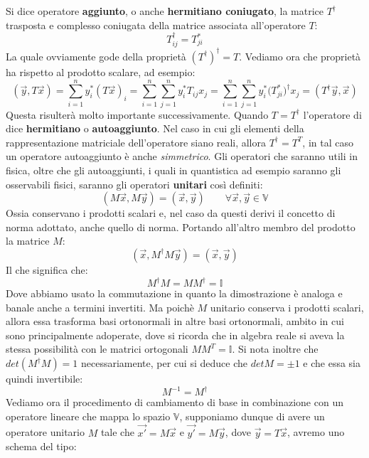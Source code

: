 Si dice operatore \textbf{aggiunto}, o anche \textbf{hermitiano coniugato}, la matrice $T^{\dagger}$ trasposta e complesso coniugata della matrice associata all'operatore $T$:
\begin{equation}
    T_{ij}^{\dagger} = T_{ji}^{*}
\end{equation}
La quale ovviamente gode della proprietà $(T^{\dagger})^{\dagger}=T$. Vediamo ora che proprietà ha rispetto al prodotto scalare, ad esempio:
\begin{equation*}
    (\vec{y},T\vec{x}) =
    \sum_{i=1}^{n} {y}_i^{*} (T\vec{x})_i =
    \sum_{i=1}^{n} \sum_{j=1}^{n} {y}_i^{*} T_{ij} x_j =
    \sum_{i=1}^{n} \sum_{j=1}^{n} {y}_i^{*} \bigl( T_{ji}^{*} \bigr)^{\dagger} x_j =
    (T^{\dagger}\vec{y},\vec{x})
\end{equation*}
Questa risulterà molto importante successivamente. Quando $T=T^{\dagger}$ l'operatore di dice \textbf{hermitiano} o \textbf{autoaggiunto}. Nel caso in cui gli elementi della rappresentazione matriciale dell'operatore siano reali, allora $T^{\dagger}=T^{T}$, in tal caso un operatore autoaggiunto è anche \textit{simmetrico}. Gli operatori che saranno utili in fisica, oltre che gli autoaggiunti, i quali in quantistica ad esempio saranno gli osservabili fisici, saranno gli operatori \textbf{unitari} così definiti:
\begin{equation}
    (M\vec{x},M\vec{y}) = (\vec{x},\vec{y}) \qquad \forall \vec{x},\vec{y} \in \mathbb{V}
\end{equation}
Ossia conservano i prodotti scalari e, nel caso da questi derivi il concetto di norma adottato, anche quello di norma. Portando all'altro membro del prodotto la matrice $M$:
\begin{equation*}
    (\vec{x},M^{\dagger}M\vec{y}) = (\vec{x},\vec{y})
\end{equation*}
Il che significa che:
\begin{equation}
    M^{\dagger}M = MM^{\dagger} = \mathbb{I}
\end{equation}
Dove abbiamo usato la commutazione in quanto la dimostrazione è analoga e banale anche a termini invertiti. Ma poichè $M$ unitario conserva i prodotti scalari, allora essa trasforma basi ortonormali in altre basi ortonormali, ambito in cui sono principalmente adoperate, dove si ricorda che in algebra reale si aveva la stessa possibilità con le matrici ortogonali $MM^{T}=\mathbb{I}$. Si nota inoltre che $det(M^{\dagger}M)=1$ necessariamente, per cui si deduce che $detM=\pm 1$ e che essa sia quindi invertibile:
\begin{equation}
    M^{-1} = M^{\dagger}
\end{equation}
Vediamo ora il procedimento di cambiamento di base in combinazione con un operatore lineare che mappa lo spazio $\mathbb{V}$, supponiamo dunque di avere un operatore unitario $M$ tale che $\vec{x'}=M\vec{x}$ e $\vec{y'}=M\vec{y}$, dove $\vec{y}=T\vec{x}$, avremo uno schema del tipo:


